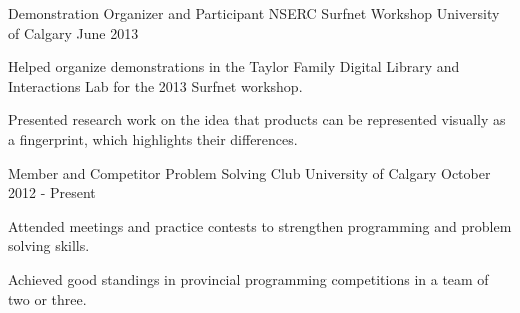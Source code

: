 \begin{cventries}
{    }
  \cventry
    {Demonstration Organizer and Participant}
    {NSERC Surfnet Workshop}
    {University of Calgary}
    {June 2013}
    {
      \begin{cvitems}
        \item {Helped organize demonstrations in the Taylor Family Digital Library and Interactions Lab for the 2013 Surfnet workshop.}
        \item {Presented research work on the idea that products can be represented visually as a fingerprint, which highlights their differences.}
      \end{cvitems}
    }
  \cventry
    {Member and Competitor}
    {Problem Solving Club}
    {University of Calgary}
    {October 2012 - Present}
    {
      \begin{cvitems}
        \item {Attended meetings and practice contests to strengthen programming and problem solving skills.}
        \item {Achieved good standings in provincial programming competitions in a team of two or three.}
      \end{cvitems}
    }
\end{cventries}
